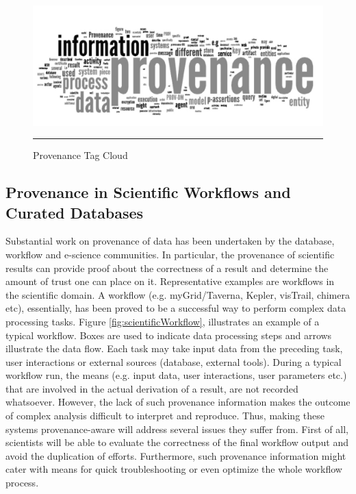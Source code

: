\begin{figure}[htbp]
	\centering
		\includegraphics[scale=0.60]{./Figures/chapter2/cloud.pdf}
		\rule{35em}{0.5pt}
	\caption[Provenance Tag Cloud]{Provenance Tag Cloud}
	\label{fig:cloudProvTheory}
\end{figure}


\subsection{Provenance in Scientific Workflows and Curated Databases}

Substantial work on provenance of data has been undertaken by the database, workflow\cite{reference6:5}\cite{reference6:9} and e-science communities.  In particular, the provenance of scientific results can provide proof about the correctness of a result and determine the amount of trust one can place on it\cite{reference5}\cite{reference36}. Representative examples are workflows in the scientific domain. A workflow (e.g. myGrid/Taverna\cite{reference6:18}, Kepler\cite{reference6:6}, visTrail\cite{reference6:13}, chimera\cite{reference6:12} etc), essentially, has been proved to be a successful way to perform complex data processing tasks. Figure \ref{fig:scientificWorkflow}, illustrates an example of a typical workflow. Boxes are used to indicate data processing steps and arrows illustrate the data flow. Each task may take input data from the preceding task, user interactions or external sources (database, external tools).  During a typical workflow run, the means (e.g. input data, user interactions, user parameters etc.) that are involved in the actual derivation of a result, are not recorded whatsoever.  However, the lack of such provenance information makes the outcome of complex analysis difficult to interpret and reproduce. Thus, making these systems provenance-aware will address several issues they suffer from. First of all, scientists will be able to evaluate the correctness of the final workflow output and avoid the duplication of efforts. Furthermore, such provenance information might cater with means for quick troubleshooting or even optimize the whole workflow process\cite{reference1:278}.

